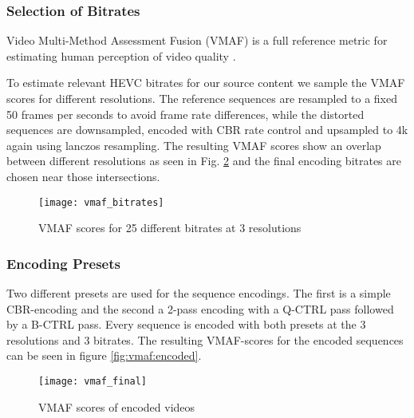 \subsubsection{Selection of Bitrates}
Video Multi-Method Assessment Fusion (VMAF) is a full reference metric for estimating human perception of video quality \cite{lin2014:fvqa}.

To estimate relevant HEVC bitrates for our source content we sample the VMAF scores for different resolutions. The reference sequences are resampled to a fixed 50 frames per seconds to avoid frame rate differences, while the distorted sequences are downsampled, encoded with CBR rate control and upsampled to 4k again using lanczos resampling. The resulting VMAF scores show an overlap between different resolutions as seen in Fig. \ref{fig:vmaf:bitrates} and the final encoding bitrates are chosen near those intersections.

\begin{figure}[h]
	\centering
	\texttt{[image: vmaf\_bitrates]}
	\caption{VMAF scores for 25 different bitrates at 3 resolutions}
	\label{fig:vmaf:bitrates}
\end{figure}

\subsubsection{Encoding Presets}
Two different presets are used for the sequence encodings. The first is a simple CBR-encoding and the second a 2-pass encoding with a Q-CTRL pass followed by a B-CTRL pass. Every sequence is encoded with both presets at the 3 resolutions and 3 bitrates. The resulting VMAF-scores for the encoded sequences can be seen in figure \ref{fig:vmaf:encoded}.


\begin{figure}[h]
	\centering
	\texttt{[image: vmaf\_final]}
	\caption{VMAF scores of encoded videos}
	\label{fig:vmaf:bitrates}
\end{figure}
